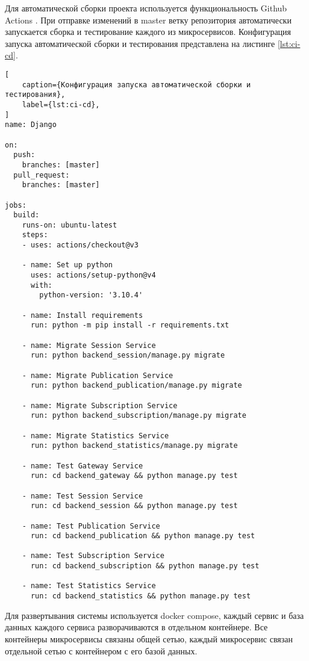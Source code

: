 Для автоматической сборки проекта используется функциональность Github Actions \cite{github-actions}.
При отправке изменений в master ветку репозитория автоматически запускается сборка и тестирование каждого из микросервисов.
Конфигурация запуска автоматической сборки и тестирования
представлена на листинге \ref{lst:ci-cd}.

\begin{lstlisting}[
	caption={Конфигурация запуска автоматической сборки и тестирования},
	label={lst:ci-cd},
]
name: Django

on:
  push:
    branches: [master]
  pull_request:
    branches: [master]

jobs:
  build:
    runs-on: ubuntu-latest
    steps:
    - uses: actions/checkout@v3

    - name: Set up python
      uses: actions/setup-python@v4
      with:
        python-version: '3.10.4'

    - name: Install requirements
      run: python -m pip install -r requirements.txt

    - name: Migrate Session Service
      run: python backend_session/manage.py migrate

    - name: Migrate Publication Service
      run: python backend_publication/manage.py migrate

    - name: Migrate Subscription Service
      run: python backend_subscription/manage.py migrate

    - name: Migrate Statistics Service
      run: python backend_statistics/manage.py migrate

    - name: Test Gateway Service
      run: cd backend_gateway && python manage.py test

    - name: Test Session Service
      run: cd backend_session && python manage.py test

    - name: Test Publication Service
      run: cd backend_publication && python manage.py test

    - name: Test Subscription Service
      run: cd backend_subscription && python manage.py test

    - name: Test Statistics Service
      run: cd backend_statistics && python manage.py test
\end{lstlisting}

Для развертывания системы используется docker compose, каждый сервис и база данных каждого сервиса разворачиваются в отдельном контейнере.
Все контейнеры микросервисы связаны общей сетью, каждый микросервис связан отдельной сетью с контейнером с его базой данных.

